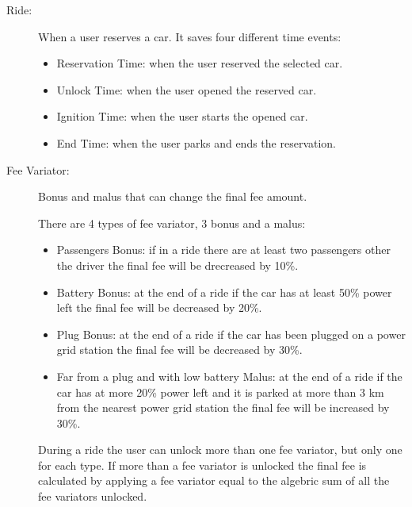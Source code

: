 \begin{description}
	\item [Ride:] When a user reserves a car. It saves four different time events:
	\begin{itemize}
		\item Reservation Time: when the user reserved the selected car.
		\item Unlock Time: when the user opened the reserved car.
		\item Ignition Time: when the user starts the opened car.
		\item End Time: when the user parks and ends the reservation.
	\end{itemize}
	\item [Fee Variator:] Bonus and malus that can change the final fee amount.
	
	There are 4 types of fee variator, 3 bonus and a malus:\begin{itemize}
		\item Passengers Bonus: if in a ride there are at least two passengers other the driver the final fee will be drecreased by 10\%.
		\item Battery Bonus: at the end of a ride if the car has at least 50\% power left the final fee will be decreased by 20\%.
		\item Plug Bonus: at the end of a ride if the car has been plugged on a power grid station the final fee will be decreased by 30\%.
		\item Far from a plug and with low battery Malus: at the end of a ride if the car has at more 20\% power left and it is parked at more than 3 km from the nearest power grid station the final fee will be increased by 30\%.
	\end{itemize}
	During a ride the user can unlock more than one fee variator, but only one for each type. If more than a fee variator is unlocked the final fee is calculated by applying a fee variator equal to the algebric sum of all the fee variators unlocked.
\end{description}
	


